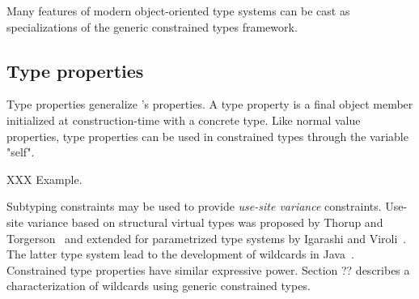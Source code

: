 Many features of modern object-oriented type systems can be
cast as specializations of the generic constrained types
framework.  

\subsection{Type properties}
\label{sec:type-properties}
\label{sec:variance}

Type properties generalize \Xten's properties.  A type property 
is a final object member initialized at construction-time with a
concrete type.  Like normal value properties, type properties
can be used in constrained types through the variable \xcd"self".

XXX Example.

Subtyping constraints may be used to
provide \emph{use-site variance}
constraints.
Use-site variance based on structural virtual types was proposed by
Thorup and Torgerson~\cite{unifying-genericity} and extended for
parametrized type systems by Igarashi and
Viroli~\cite{variant-parametric-types}.  The latter type system lead
to the development of wildcards in
Java~\cite{Java3,adding-wildcards,wildcards-safe}.  Constrained
type properties
have similar expressive power.
Section ?? \eat{~\ref{sec:wildcards}} describes a characterization of
wildcards using generic constrained types.

